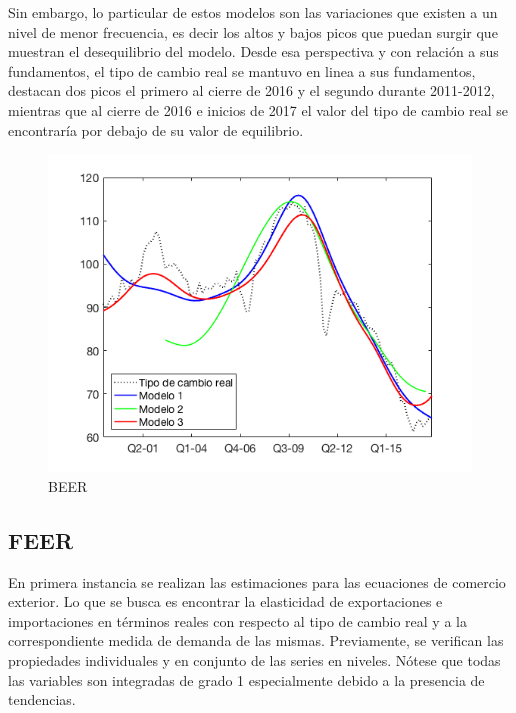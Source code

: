 \documentclass[12pt,letterpaper]{article}
\begin{document}
Sin embargo, lo particular de estos modelos son las variaciones que existen a un nivel de menor frecuencia, es decir los altos y bajos picos que puedan surgir que muestran el desequilibrio del modelo. Desde esa perspectiva y con relación a sus fundamentos, el tipo de cambio real se mantuvo en linea a sus fundamentos, destacan dos picos el primero al cierre de 2016 y el segundo durante 2011-2012, mientras que al cierre de 2016 e inicios de 2017 el valor del tipo de cambio real se encontraría por debajo de su valor de equilibrio.   

\begin{figure}
\centering
\caption{BEER}
\includegraphics[scale=0.6]{fig19}
\end{figure}













\subsection*{FEER}

En primera instancia se realizan las estimaciones para las ecuaciones de comercio exterior. Lo que se busca es encontrar la elasticidad de exportaciones e importaciones en términos reales con respecto al tipo de cambio real y a la correspondiente medida de demanda de las mismas. Previamente, se verifican las propiedades individuales y en conjunto de las series en niveles. Nótese que todas las variables son integradas de grado 1 especialmente debido a la presencia de tendencias.
\end{document}
